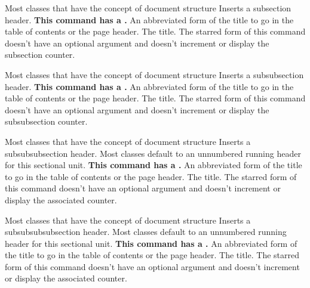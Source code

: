 %
 {}%
 {Most classes that have the concept of document structure}%
 {Inserts a subsection header. \textbf{This command has a .}}%
 {%
   \BeginArgList
      An abbreviated form of the title to
       go in the table of contents or the page header.
      The title.
   \EndArgList
   The starred form of this command doesn't have an optional
   argument and doesn't increment or display the subsection counter.
 }

%
 {}%
 {Most classes that have the concept of document structure}%
 {Inserts a subsubsection header. \textbf{This command has a .}}%
 {%
   \BeginArgList
      An abbreviated form of the title to
       go in the table of contents or the page header.
      The title.
   \EndArgList
   The starred form of this command doesn't have an optional
   argument and doesn't increment or display the subsubsection counter.
 }

%
 {}%
 {Most classes that have the concept of document structure}%
 {Inserts a subsubsubsection header. Most classes default to an 
  unnumbered running header for
  this sectional unit. \textbf{This command has a .}}%
 {%
   \BeginArgList
      An abbreviated form of the title to
       go in the table of contents or the page header.
      The title.
   \EndArgList
   The starred form of this command doesn't have an optional
   argument and doesn't increment or display the associated counter.
 }

%
 {}%
 {Most classes that have the concept of document structure}%
 {Inserts a subsubsubsubsection header. Most classes default 
  to an unnumbered running header for
  this sectional unit. \textbf{This command has a .}}%
 {%
   \BeginArgList
      An abbreviated form of the title to
       go in the table of contents or the page header.
      The title.
   \EndArgList
   The starred form of this command doesn't have an optional
   argument and doesn't increment or display the associated counter.
 }


